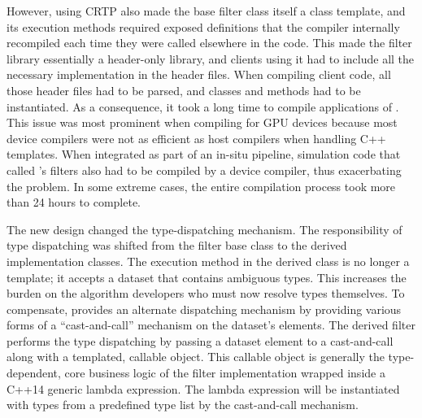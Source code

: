 
However, using CRTP also made the base filter class itself a class template, and its execution methods required exposed definitions that the compiler internally recompiled each time they were called elsewhere in the code.
This made the \vtkm filter library essentially a header-only library, and clients using it had to include all the necessary implementation in the header files.
When compiling client code, all those header files had to be parsed, and classes and methods had to be instantiated.
As a consequence, it took a long time to compile applications of \vtkm.
This issue was most prominent when compiling for GPU devices because most device compilers were not as efficient as host compilers when handling C++ templates.
When integrated as part of an in-situ pipeline, simulation code that called \vtkm's filters also had to be compiled by a device compiler, thus exacerbating the problem.
In some extreme cases, the entire compilation process took more than 24 hours to complete.

The new design changed the type-dispatching mechanism.
The responsibility of type dispatching was shifted from the filter base class to the derived implementation classes.
The execution method in the derived class is no longer a template; it accepts a dataset that contains ambiguous types.
This increases the burden on the algorithm developers who must now resolve types themselves.
To compensate, \vtkm provides an alternate dispatching mechanism by providing various forms of a ``cast-and-call'' mechanism on the dataset's elements.
The derived filter performs the type dispatching by passing a dataset element to a cast-and-call along with a templated, callable object.
This callable object is generally the type-dependent, core business logic of the filter implementation wrapped inside a C++14 generic lambda expression.
The lambda expression will be instantiated with types from a predefined type list by the cast-and-call mechanism.

